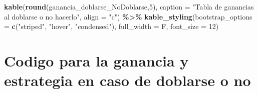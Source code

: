 \documentclass[12pt,a4paper,]{book}
\newenvironment{Shaded}{\begin{snugshade}}{\end{snugshade}}
\newcommand{\AttributeTok}[1]{\textcolor[rgb]{0.13,0.29,0.53}{#1}}
\newcommand{\DecValTok}[1]{\textcolor[rgb]{0.00,0.00,0.81}{#1}}
\newcommand{\FunctionTok}[1]{\textcolor[rgb]{0.13,0.29,0.53}{\textbf{#1}}}
\newcommand{\NormalTok}[1]{#1}
\newcommand{\SpecialCharTok}[1]{\textcolor[rgb]{0.81,0.36,0.00}{\textbf{#1}}}
\newcommand{\StringTok}[1]{\textcolor[rgb]{0.31,0.60,0.02}{#1}}
\numberwithin{dummy}{section}
\theoremstyle{ocrenumbox}
\theoremstyle{blacknumex}
\theoremstyle{blacknumbox}
\theoremstyle{ocrenum}
\theoremstyle{ocrenum}
\begin{document}
\begin{Shaded}
\begin{Highlighting}[]
\FunctionTok{kable}\NormalTok{(}\FunctionTok{round}\NormalTok{(ganancia\_doblarse\_NoDoblarse,}\DecValTok{5}\NormalTok{), }
      \AttributeTok{caption =} \StringTok{"Tabla de ganancias al doblarse o no hacerlo"}\NormalTok{,}
      \AttributeTok{align =} \StringTok{"c"}\NormalTok{) }\SpecialCharTok{\%\textgreater{}\%}
  \FunctionTok{kable\_styling}\NormalTok{(}\AttributeTok{bootstrap\_options =} \FunctionTok{c}\NormalTok{(}\StringTok{"striped"}\NormalTok{, }\StringTok{"hover"}\NormalTok{, }\StringTok{"condensed"}\NormalTok{),}
                \AttributeTok{full\_width =}\NormalTok{ F, }\AttributeTok{font\_size =} \DecValTok{12}\NormalTok{)}
\end{Highlighting}
\end{Shaded}

\hypertarget{codigo-para-la-ganancia-y-estrategia-en-caso-de-doblarse-o-no-1}{%
\section{Codigo para la ganancia y estrategia en caso de doblarse o
no}\label{codigo-para-la-ganancia-y-estrategia-en-caso-de-doblarse-o-no-1}}
\end{document}
